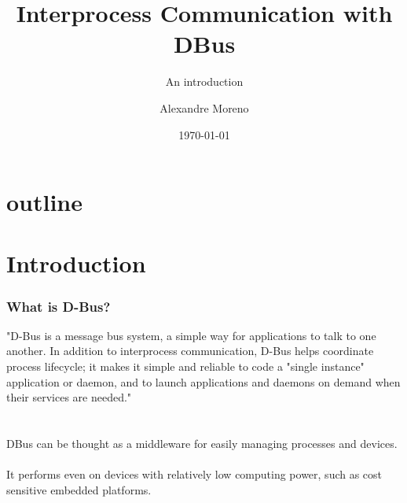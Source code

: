\documentclass[xcolor=dvipsnames,compress]{beamer}
\title[dbus]{Interprocess Communication with DBus}
\subtitle{An introduction}
\author{Alexandre Moreno}
\institute[Seenergy]{SEEnergy Corp.\\
   \texttt{alexandre@seenergy.com.tw}
}
\date{\today}
\begin{document}
\begin{frame}[plain]
   \titlepage
\end{frame}

\section*{outline}
\begin{frame}
   \tableofcontents
\end{frame}

\section[intro]{Introduction}
\begin{frame}
    \frametitle{What is D-Bus?}
    "D-Bus is a message bus system, a simple way for applications to talk to one another. In addition to interprocess communication, 
    D-Bus helps coordinate process lifecycle; it makes it simple and reliable to code a "single instance" application or daemon, 
    and to launch applications and daemons on demand when their services are needed."\\
    \hspace*{\fill} \\~\\
    DBus can be thought as a middleware for easily managing processes and devices.\\~\\
    It performs even on devices with relatively low computing power, such as cost sensitive embedded platforms.\\~\\
\end{frame}
\end{document}
